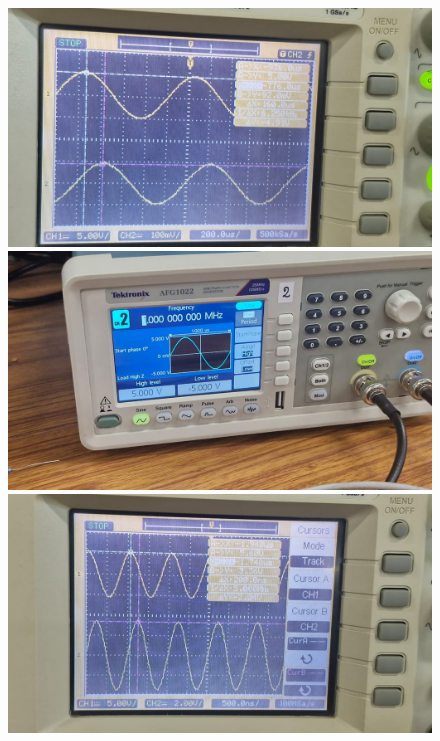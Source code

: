 \documentclass[a4paper,12pt]{article}
\begin{document}
\begin{figure}[h]
    \begin{minipage}{0.3\textwidth}
        \centering
        \includegraphics[width=\textwidth]{fig/Fig1 (10).jpg}
    \end{minipage}
    \begin{minipage}{0.3\textwidth}
        \centering
        \includegraphics[width=\textwidth]{fig/Fig1 (11).jpg}
    \end{minipage}
    \begin{minipage}{0.3\textwidth}
        \centering
        \includegraphics[width=\textwidth]{fig/Fig1 (12).jpg}
    \end{minipage}


\end{figure}
\end{document}
